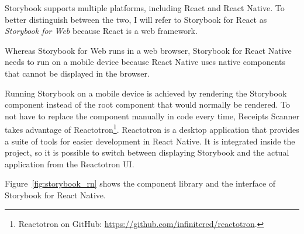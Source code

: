\documentclass[
  digital, %
  table,   %
  oneside, %
  lof,     %
  lot,     %
]{fithesis3}
\begin{document}
Storybook supports multiple platforms, including React and React Native. To better distinguish between the two, I will refer to Storybook for React as \textit{Storybook for Web} because React is a web framework.

Whereas Storybook for Web runs in a web browser, Storybook for React Native needs to run on a mobile device because React Native uses native components that cannot be displayed in the browser.

\label{phantom:reactotron}
Running Storybook on a mobile device is achieved by rendering the Storybook component instead of the root component that would normally be rendered. To not have to replace the component manually in code every time, Receipts Scanner takes advantage of Reactotron\footnote{Reactotron on GitHub: \url{https://github.com/infinitered/reactotron}.}. Reactotron is a desktop application that provides a suite of tools for easier development in React Native. It is integrated inside the project, so it is possible to switch between displaying Storybook and the actual application from the Reactotron UI. 

Figure~\ref{fig:storybook_rn} shows the component library and the interface of Storybook for React Native.
\end{document}
